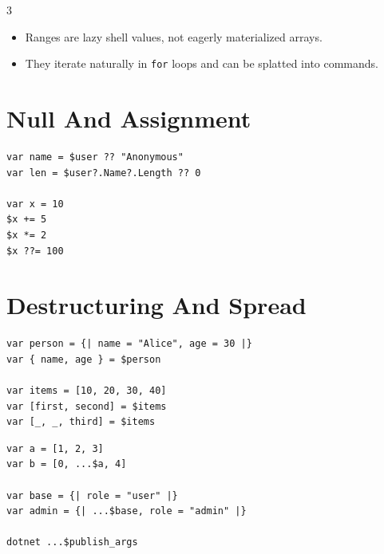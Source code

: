 \begin{multicols*}{3}
\begin{itemize}
\item Ranges are lazy shell values, not eagerly materialized arrays.
\item They iterate naturally in \texttt{for} loops and can be splatted into commands.
\end{itemize}

\columnbreak

\section{Null And Assignment}
\begin{lstlisting}
var name = $user ?? "Anonymous"
var len = $user?.Name?.Length ?? 0

var x = 10
$x += 5
$x *= 2
$x ??= 100
\end{lstlisting}



\section{Destructuring And Spread}
\begin{lstlisting}
var person = {| name = "Alice", age = 30 |}
var { name, age } = $person

var items = [10, 20, 30, 40]
var [first, second] = $items
var [_, _, third] = $items
\end{lstlisting}

\begin{lstlisting}
var a = [1, 2, 3]
var b = [0, ...$a, 4]

var base = {| role = "user" |}
var admin = {| ...$base, role = "admin" |}

dotnet ...$publish_args
\end{lstlisting}


\end{multicols*}

